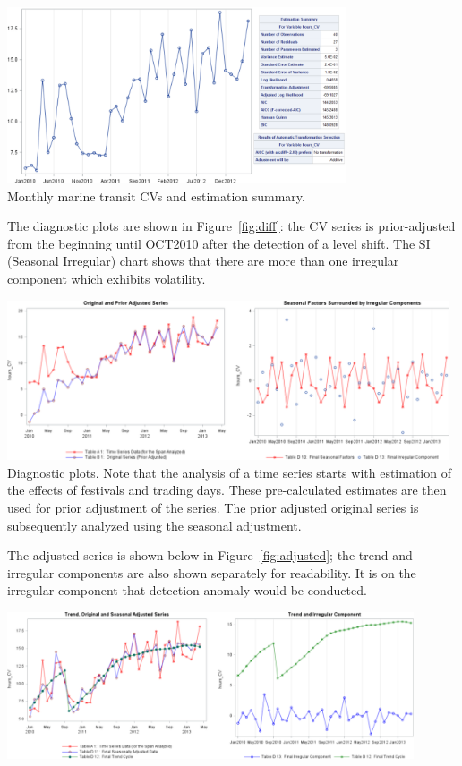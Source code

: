 \documentclass[20pt,landscape,footrule,headrule]{foils}
\begin{document}
\begin{center}
\begin{center}
\includegraphics[width=0.75\textwidth]{Images/CV_continuously.png} \\ 
Monthly marine transit CVs and estimation summary.
\end{center}\par The diagnostic plots are shown in Figure~\ref{fig:diff}: the CV series is prior-adjusted from the beginning until OCT2010 after the detection of a level shift. The SI (Seasonal Irregular) chart shows that there are more than one irregular component which exhibits volatility.
\begin{center}
\includegraphics[width=0.98\textwidth]{Images/DiffComponents.png}
\\ Diagnostic plots. Note that the analysis of a time series starts with estimation of the effects of festivals and trading days. These pre-calculated
estimates are then used for prior adjustment of the series. The prior adjusted original series is subsequently analyzed using the seasonal adjustment.
\end{center}
The adjusted series is shown below in Figure~\ref{fig:adjusted}; the trend and irregular components are also shown separately for readability. It is on the irregular component that detection anomaly would be conducted. 
\begin{center}
\includegraphics[width=0.9\textwidth]{Images/adjustedplot.png} \\ 

\end{center}
\end{center}
\end{document}
